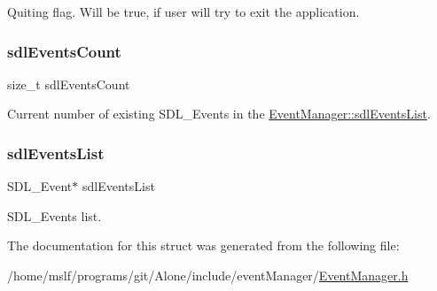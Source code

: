Quiting flag. Will be true, if user will try to exit the application. \hypertarget{struct_event_manager_a2ef8242634939408c466f0f3f221b1cb}{}\label{struct_event_manager_a2ef8242634939408c466f0f3f221b1cb} 
\subsubsection{\texorpdfstring{sdl\+Events\+Count}{sdlEventsCount}}
{\footnotesize\ttfamily size\+\_\+t sdl\+Events\+Count}

Current number of existing S\+D\+L\+\_\+\+Events in the \hyperlink{struct_event_manager_ac563054d2cefbd8d20b1daf70eb35d78}{Event\+Manager\+::sdl\+Events\+List}. \hypertarget{struct_event_manager_ac563054d2cefbd8d20b1daf70eb35d78}{}\label{struct_event_manager_ac563054d2cefbd8d20b1daf70eb35d78} 
\subsubsection{\texorpdfstring{sdl\+Events\+List}{sdlEventsList}}
{\footnotesize\ttfamily S\+D\+L\+\_\+\+Event$\ast$ sdl\+Events\+List}

S\+D\+L\+\_\+\+Events list. 

The documentation for this struct was generated from the following file\+:\begin{DoxyCompactItemize}
\item 
/home/mslf/programs/git/\+Alone/include/event\+Manager/\hyperlink{_event_manager_8h}{Event\+Manager.\+h}\end{DoxyCompactItemize}

